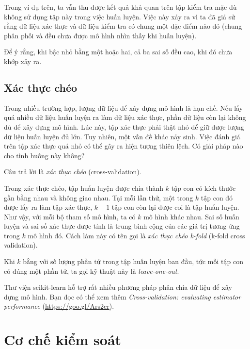 Trong ví dụ trên, ta vẫn thu được kết quả khả quan trên tập kiểm tra mặc dù không sử dụng tập này trong việc huấn luyện. Việc này xảy ra vì ta đã giả sử rằng dữ liệu xác thực và dữ liệu kiểm tra
có chung một đặc điểm nào đó (chung phân phối và đều chưa được mô hình nhìn thấy
khi huấn luyện). 

Để ý rằng, khi bậc nhỏ bằng một hoặc hai, cả ba sai số đều cao, khi đó chưa khớp xảy ra.
 
 
 
\subsection{Xác thực chéo}
\label{ssec:crosvalid}

Trong nhiều trường hợp, lượng dữ liệu để xây dựng mô hình là hạn chế. Nếu lấy
quá nhiều dữ liệu huấn luyện ra làm dữ liệu xác thực, phần dữ liệu còn lại không
đủ để xây dựng mô hình. Lúc này, tập xác thực phải thật nhỏ để giữ được lượng dữ
liệu huấn luyện đủ lớn. Tuy nhiên, một vấn đề khác nảy sinh. Việc đánh giá trên tập xác thực quá nhỏ có thể gây ra hiện tượng thiên lệch. Có giải pháp nào cho tình huống này không?
 
Câu trả lời là \textit{xác thực chéo} ({cross-validation}).
 
Trong xác thực chéo, tập huấn luyện được chia thành $k$ tập con có kích thước gần bằng nhau và không giao nhau. Tại mỗi lần thử, một trong $k$ tập con đó được lấy ra làm tập xác thực, $k-1$ tập con còn lại được coi là tập huấn luyện. Như vậy, với mỗi bộ tham số mô hình, ta có $k$ mô hình khác nhau. Sai số huấn luyện và sai số xác thực được tính là trung bình cộng của các giá trị tương ứng trong $k$ mô hình đó. Cách làm này có tên gọi là \textit{xác thực chéo k-fold} (k-fold cross validation).
 
Khi $k$ bằng với số lượng phần tử trong tập huấn luyện ban đầu, tức mỗi
tập con có đúng một phần tử, ta gọi kỹ thuật này là \textit{leave-one-out}.
 
Thư viện scikit-learn hỗ trợ rất nhiều phương pháp phân chia dữ liệu để xây dựng mô hình. Bạn đọc có thể xem thêm
\textit{Cross-validation: evaluating estimator performance} (\url{https://goo.gl/Ars2cr}).
 
 
 
 
 
\section{Cơ chế kiểm soát}
 
